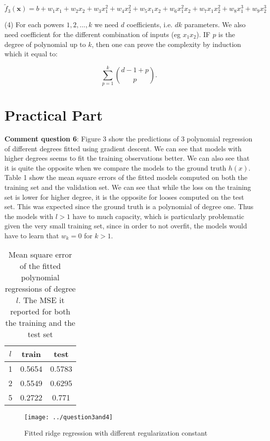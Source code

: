 \documentclass[11pt,english]{article}
\begin{document}
    $\tilde{f}_3 (\bm{x})=b + w_1 x_1 + w_2 x_2 + w_3 x_1^2 + w_4 x_2^2 + w_5 x_1 x_2 + w_6 x_1^2x_2 + w_7 x_1x_2^2 + w_8x_1^3 + w_9x_2^3$

    (4) For each powers $1,2,...,k$ we need $d$ coefficients, i.e. $dk$ parameters. We also need coefficient for the different combination of inputs (eg $x_1x_2$). IF $p$ is the degree of polynomial up to $k$, then one can prove the complexity by induction which it equal to:
    
    $$\sum_{p=1}^{k} \binom{d-1+p}{p}.$$



	\section{Practical Part}
	
	\textbf{Comment question 6}: Figure 3 show the predictions of 3 polynomial regression of different degrees fitted using gradient descent. We can see that models with higher degrees seems to fit the training observations better. We can also see that it is quite the opposite when we compare the models to the ground truth $h(x)$. Table 1 show the mean square errors of the fitted models computed on both the training set and the validation set. We can see that while the loss on the training set is lower for higher degree, it is the opposite for looses computed on the test set. This was expected since the ground truth is a polynomial of degree one. Thus the models with $l>1$ have to much capacity, which is particularly problematic given the very small training set, since in order to not overfit, the models would have to learn that $w_k=0$ for $k>1$. 
	
	\begin{table}[h!]
		\centering
		
		\begin{tabular}{c|cc}
			$l$ & train & test \\ 
			\hline 
			1 & 0.5654 & 0.5783  \\ 
			2 & 0.5549  & 0.6295 \\ 
			5 & 0.2722 & 0.771  \\ 
		\end{tabular}
		
		\caption{Mean square error of the fitted polynomial regressions of degree $l$. The MSE it reported for both the training and the test set} 
		
	\end{table}
	
	\begin{figure}[h!]
		\centering
		\texttt{[image: ../question3and4]}
		\caption[Question 3 and 4]{Fitted ridge regression with different regularization constant}
		\label{fig:question3and4}
	\end{figure}
	
\end{document}
